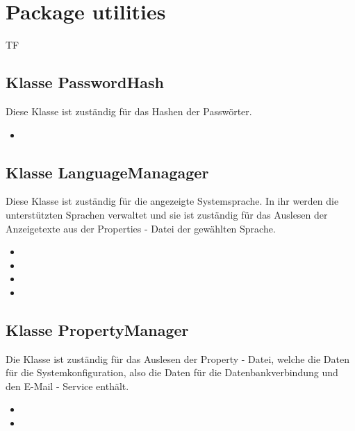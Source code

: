 	
	\section{Package utilities}
	\begin{tiny}
		TF
	\end{tiny}
	\subsection{Klasse PasswordHash}
	Diese Klasse ist zuständig für das Hashen der Passwörter.
	\begin{itemize}
		\item {}
	\end{itemize}
	
	\subsection{Klasse LanguageManagager}
	Diese Klasse ist zuständig für die angezeigte Systemsprache. In ihr werden die unterstützten Sprachen verwaltet und sie ist zuständig für das Auslesen der Anzeigetexte aus der Properties - Datei der gewählten Sprache.
	\begin{itemize}
		\item {}
		\item {}
		\item {}
		\item {}
	\end{itemize}
	
	\subsection{Klasse PropertyManager}
	Die Klasse ist zuständig für das Auslesen der Property - Datei, welche die Daten für die Systemkonfiguration, also die Daten für die Datenbankverbindung und den E-Mail - Service enthält.
	\begin{itemize}
		\item {}
		\item {}
	\end{itemize}
	
